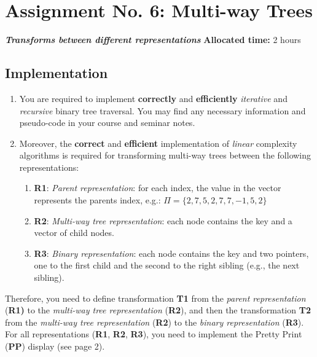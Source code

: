 \documentclass[../en-fa-lab.tex]{subfiles}
\begin{document}
\section{\texorpdfstring{\textbf{Assignment No. 6: Multi-way Trees }}{Assignment No. 6: Multi-way Trees}}\label{assign6}

\emph{\textbf{Transforms between different representations}}
\textbf{Allocated time:} 2 hours

\subsection{Implementation}\label{implementation}

\begin{enumerate}
\def\labelenumi{\arabic{enumi}.}
\item
  You are required to implement \textbf{correctly} and
  \textbf{efficiently} \emph{iterative} and \emph{recursive} binary tree
  traversal. You may find any necessary information and pseudo-code in
  your course and seminar notes.
\item
  Moreover, the \textbf{correct} and \textbf{efficient} implementation
  of \emph{linear} complexity algorithms is required for transforming
  multi-way trees between the following representations:

  \begin{enumerate}
  \def\labelenumii{\arabic{enumii}.}
  \item
    \textbf{R1}: \emph{Parent representation}: for each index, the value
    in the vector represents the parent\textquotesingle s index, e.g.:
    \(\Pi = \{ 2,7,5,2,7,7, - 1,5,2\}\)
  \item
    \textbf{R2}: \emph{Multi-way tree representation}: each node
    contains the key and a vector of child nodes.
  \item
    \textbf{R3}: \emph{Binary representation}: each node contains the
    key and two pointers, one to the first child and the second to the
    right sibling (e.g., the next sibling).
  \end{enumerate}
\end{enumerate}

Therefore, you need to define transformation \textbf{T1} from the
\emph{parent representation} (\textbf{R1)} to the \emph{multi-way tree
representation} (\textbf{R2}), and then the transformation \textbf{T2}
from the \emph{multi-way tree representation} (\textbf{R2}) to the
\emph{binary representation} (\textbf{R3}). For all representations
(\textbf{R1}, \textbf{R2}, \textbf{R3}), you need to implement the
Pretty Print (\textbf{PP}) display (see page 2).
\end{document}
